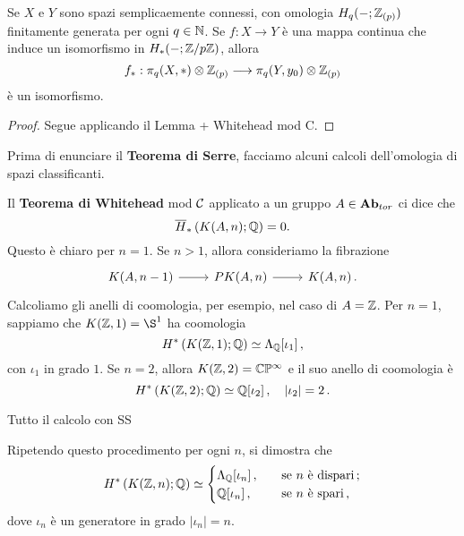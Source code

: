 \begin{cor}
	Se $X$ e $Y$ sono spazi semplicaemente connessi,
	con omologia $H_{q}(-;{\mathbb Z}_{(p)})$ finitamente generata per ogni $q \in {\mathbb N}$.
	Se $f:X \to Y$ è una mappa continua che induce un isomorfismo
	in $H_{*}(-;{\mathbb Z}/p{\mathbb Z})$, allora
	\begin{equation*}
		f_{*}:\pi_{q}(X, \ast) \otimes {\mathbb Z}_{(p)}
		\longrightarrow \pi_{q}(Y, y_{0}) \otimes {\mathbb Z}_{(p)}
	\end{equation*}
	è un isomorfismo.
	\begin{proof}
		Segue applicando il Lemma + Whitehead mod C.
	\end{proof}
\end{cor}

Prima di enunciare il \textbf{Teorema di Serre},
facciamo alcuni calcoli dell'omologia di spazi classificanti.

\begin{ex}
	Il \textbf{Teorema di Whitehead} mod $\mathcal{C}$ applicato a un gruppo $A \in {\normalfont\textbf{Ab}}_{tor}$
	ci dice che
	\begin{equation*}
		\overline{H}_{*}\left(K(A,n) ; {\mathbb Q} \right) = 0.
	\end{equation*}
	Questo è chiaro per $n=1$. Se $n>1$, allora consideriamo la fibrazione
	\begin{equation*}
		\begin{tikzcd}
			K(A,n-1) \ar[r]
			& PK(A,n) \ar[r]
			& K(A,n)\,.
		\end{tikzcd}
	\end{equation*}
	Calcoliamo gli anelli di coomologia, per esempio, nel caso di $A={\mathbb Z}$.
	Per $n=1$, sappiamo che $K(\Z,1)=\S^{1}$ ha coomologia
	\begin{equation*}
		H^{*}\left( K({\mathbb Z},1); {\mathbb Q} \right) \simeq \Lambda_{{\mathbb Q}}[\iota_{1}]\,,
	\end{equation*}
	con $\iota_{1}$ in grado $1$.
	Se $n=2$, allora $K({\mathbb Z},2) = \mathbb{C}\mathbb{P}^{\infty}$ e il suo anello di coomologia è
	\begin{equation*}
		H^{*}\left( K({\mathbb Z},2) ; {\mathbb Q} \right) \simeq {\mathbb Q}[\iota_{2}]\,,
		\quad \lvert \iota_{2} \rvert = 2\,.
	\end{equation*}
	
	Tutto il calcolo con SS 
	
	Ripetendo questo procedimento per ogni $n$, si dimostra che
	\begin{equation*}
		H^{*}\left( K({\mathbb Z},n) ; {\mathbb Q} \right) \simeq
		\begin{cases}
			\Lambda_{{\mathbb Q}}[\iota_{n}]\,, \quad &\text{se } n \text{ è dispari}\,; \\
			{\mathbb Q}[\iota_{n}]\,, \quad &\text{se } n \text{ è spari}\,,
		\end{cases}
	\end{equation*}
	dove $\iota_{n}$ è un generatore in grado $|\iota_{n}|=n$.
\end{ex}

